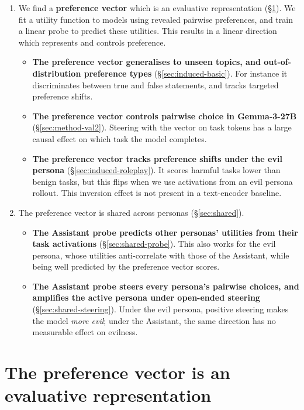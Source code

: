 \documentclass{article}
\begin{document}
\begin{enumerate}
\item We find a \textbf{preference vector} which is an evaluative representation (\S\ref{sec:method}). We fit a utility function to models using revealed pairwise preferences, and train a linear probe to predict these utilities. This results in a linear direction which represents and controls preference.
\begin{itemize}
    \item \textbf{The preference vector generalises to unseen topics, and out-of-distribution preference types} (\S\ref{sec:induced-basic}). For instance it discriminates between true and false statements, and tracks targeted preference shifts.
    \item \textbf{The preference vector controls pairwise choice in Gemma-3-27B} (\S\ref{sec:method-val2}). Steering with the vector on task tokens has a large causal effect on which task the model completes.
    \item \textbf{The preference vector tracks preference shifts under the evil persona} (\S\ref{sec:induced-roleplay}). It scores harmful tasks lower than benign tasks, but this flips when we use activations from an evil persona rollout. This inversion effect is not present in a text-encoder baseline.
\end{itemize}
\item The preference vector is shared across personas (\S\ref{sec:shared}).
\begin{itemize}
    \item \textbf{The Assistant probe predicts other personas' utilities from their task activations} (\S\ref{sec:shared-probe}). This also works for the evil persona, whose utilities anti-correlate with those of the Assistant, while being well predicted by the preference vector scores.
    \item \textbf{The Assistant probe steers every persona's pairwise choices, and amplifies the active persona under open-ended steering} (\S\ref{sec:shared-steering}). Under the evil persona, positive steering makes the model \textit{more evil}; under the Assistant, the same direction has no measurable effect on evilness.
\end{itemize}
\end{enumerate}

\section{The preference vector is an evaluative representation}
\label{sec:method}
\end{document}
